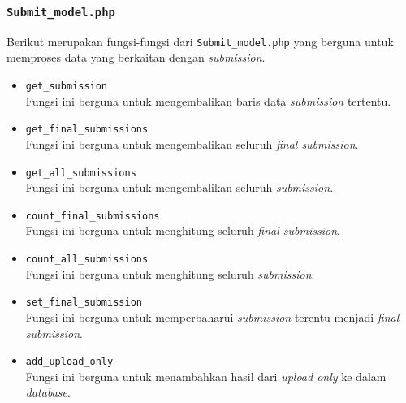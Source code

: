 \subsubsection{\texttt{Submit\_model.php}}
Berikut merupakan fungsi-fungsi dari \texttt{Submit\_model.php} yang berguna untuk memproses data yang berkaitan dengan \textit{submission}.
\begin{itemize}
	\item \texttt{get\_submission}\\
	Fungsi ini berguna untuk mengembalikan baris data \textit{submission} tertentu.
	\item \texttt{get\_final\_submissions}\\
	Fungsi ini berguna untuk mengembalikan seluruh \textit{final submission}.
	\item \texttt{get\_all\_submissions}\\
	Fungsi ini berguna untuk mengembalikan seluruh \textit{submission}.
	\item \texttt{count\_final\_submissions}\\
	Fungsi ini berguna untuk menghitung seluruh \textit{final submission}.
	\item \texttt{count\_all\_submissions}\\
	Fungsi ini berguna untuk menghitung seluruh \textit{submission}.
	\item \texttt{set\_final\_submission}\\
	Fungsi ini berguna untuk memperbaharui \textit{submission} terentu menjadi \textit{final submission}.
	\item \texttt{add\_upload\_only}\\
	Fungsi ini berguna untuk menambahkan hasil dari \textit{upload only} ke dalam \textit{database}.
\end{itemize}
